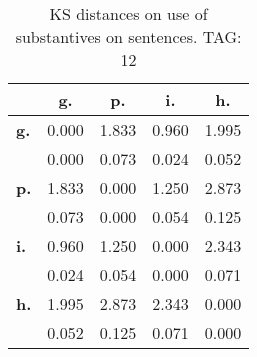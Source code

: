 \begin{table}[h!]
\begin{center}
\begin{tabular}{| l || c | c | c | c |}\hline
 & {\bf g.} & {\bf p.} & {\bf i.} & {\bf h.} \\\hline\hline
{\bf g.} & 0.000 & 1.833 & 0.960 & 1.995 \\
{\bf } & 0.000 & 0.073 & 0.024 & 0.052 \\\hline
{\bf p.} & 1.833 & 0.000 & 1.250 & 2.873 \\
{\bf } & 0.073 & 0.000 & 0.054 & 0.125 \\\hline
{\bf i.} & 0.960 & 1.250 & 0.000 & 2.343 \\
{\bf } & 0.024 & 0.054 & 0.000 & 0.071 \\\hline
{\bf h.} & 1.995 & 2.873 & 2.343 & 0.000 \\
{\bf } & 0.052 & 0.125 & 0.071 & 0.000 \\\hline
\end{tabular}
\caption{KS distances on use of substantives on sentences. TAG: 12}
\end{center}
\end{table}